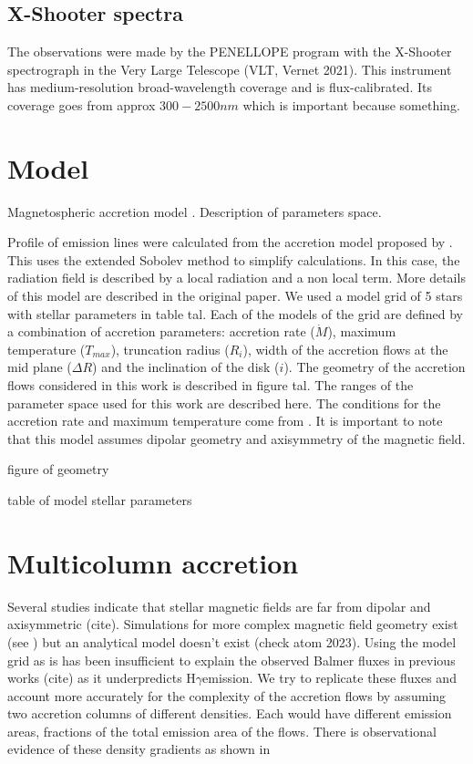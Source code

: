 \documentclass[twocolumn,linenumbers]{aastex631}
\newcommand{\hgamma}{H$\gamma$}
\begin{document}
\subsection{X-Shooter spectra}

The observations were made by the PENELLOPE program with the X-Shooter spectrograph in the Very Large Telescope (VLT, Vernet 2021). This instrument has medium-resolution broad-wavelength coverage and is flux-calibrated. Its coverage goes from approx $300-2500nm$  which is important because something. 
 
\section{Model} \label{Models}

Magnetospheric accretion model \citep{muzerolle2001}. Description of parameters space.

Profile of emission lines were calculated from the accretion model proposed by \citet{muzerolle2001}. This uses the extended Sobolev method to simplify calculations. In this case, the radiation field is described by a local radiation and a non local term. More details of this model are described in the original paper. We used a model grid of 5 stars with stellar parameters in table tal. Each of the models of the grid are defined by a combination of accretion parameters: accretion rate ($\dot{M}$), maximum temperature ($T_{max}$), truncation radius ($R_i$), width of the accretion flows at the mid plane ($\Delta R$) and the inclination of the disk ($i$). The geometry of the accretion flows considered in this work is described in figure tal.  The ranges of the parameter space used for this work are described here. The conditions for the accretion rate and maximum temperature come from \citet{muzerolle2001}.  It is important to note that this model assumes dipolar geometry and axisymmetry of the magnetic field. 

figure of geometry



table of model stellar parameters

\section{Multicolumn accretion}

Several studies indicate that stellar magnetic fields are far from dipolar and axisymmetric (cite). Simulations for more complex magnetic field geometry exist (see \citet{romanova2003}) but an analytical model doesn't exist (check atom 2023). Using the model grid as is has been insufficient to explain the observed Balmer fluxes in previous works (cite) as it underpredicts \hgamma emission. We try to replicate these fluxes and account more accurately for the complexity of the accretion flows by assuming two accretion columns of different densities. Each would have different emission areas, fractions of the total emission area of the flows. There is observational evidence of these density gradients as shown in \citet{}
\end{document}
